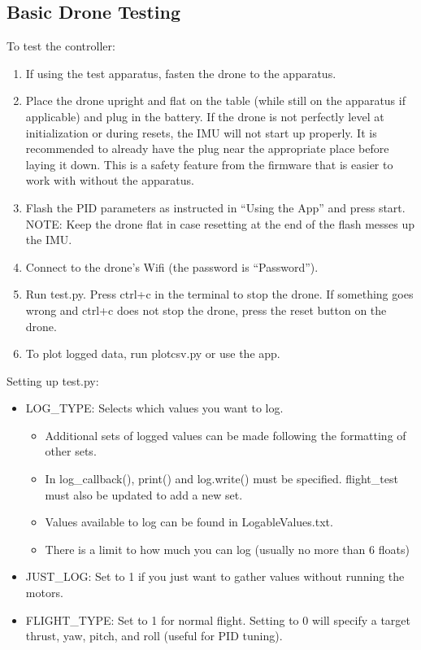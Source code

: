 \documentclass[12pt, titlepage]{article}
\begin{document}
\subsection{Basic Drone Testing}
To test the controller:
\begin{enumerate}
\item If using the test apparatus, fasten the drone to the apparatus.
\item Place the drone upright and flat on the table (while still on the apparatus if applicable) and plug in the battery. If the drone is not perfectly level at initialization or during resets, the IMU will not start up properly. It is recommended to already have the plug near the appropriate place before laying it down. This is a safety feature from the firmware that is easier to work with without the apparatus.
\item Flash the PID parameters as instructed in ``Using the App'' and press start. NOTE: Keep the drone flat in case resetting at the end of the flash messes up the IMU.
\item Connect to the drone's Wifi (the password is ``Password'').
\item Run test.py. Press ctrl+c in the terminal to stop the drone. If something goes wrong and ctrl+c does not stop the drone, press the reset button on the drone.
\item To plot logged data, run plotcsv.py or use the app.
\end{enumerate}
Setting up test.py:
\begin{itemize}
\item LOG\_TYPE: Selects which values you want to log.
\begin{itemize}
\item Additional sets of logged values can be made following the formatting of other sets.
\item In log\_callback(), print() and log.write() must be specified. flight\_test must also be updated to add a new set.
\item Values available to log can be found in LogableValues.txt.
\item There is a limit to how much you can log (usually no more than 6 floats)
\end{itemize}
\item JUST\_LOG: Set to 1 if you just want to gather values without running the motors.
\item FLIGHT\_TYPE: Set to 1 for normal flight. Setting to 0 will specify a target thrust, yaw, pitch, and roll (useful for PID tuning).
\end{itemize}
\end{document}
